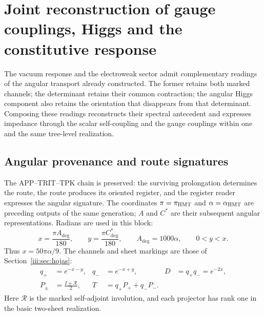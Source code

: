\section{Joint reconstruction of gauge couplings, Higgs and the constitutive response}
\label{amp-higgs-seccion}

The vacuum response and the electroweak sector admit complementary readings
of the angular transport already constructed. The former retains both marked
channels; the determinant retains their common contraction; the angular Higgs
component also retains the orientation that disappears from that determinant.
Composing these readings reconstructs their spectral antecedent and expresses
impedance through the scalar self-coupling and the gauge couplings within one
and the same tree-level realization.

\subsection{Angular provenance and route signatures}

The APP--TRIT--TPK chain is preserved: the surviving prolongation determines
the route, the route produces its oriented register, and the register reader
expresses the angular signature. The coordinates $\pi=\pi_{\rm HMT}$ and
$\alpha=\alpha_{\rm HMT}$ are preceding outputs of the same generation;
$A$ and $C^*$ are their subsequent angular representations. Radians are used
in this block:
\begin{equation}
 x=\frac{\pi A_{\deg}}{180},\qquad
 y=\frac{\pi C^*_{\deg}}{180},\qquad
 A_{\deg}=1000\alpha,\qquad 0<y<x.
 \label{amp-higgs-angulos}
\end{equation}
Thus $x=50\pi\alpha/9$. The channels and sheet markings are those of
Section~\ref{iii:sec:hojas}:
\begin{equation}
 \begin{aligned}
 q_+&=e^{-x-y},& q_-&=e^{-x+y},& D&=q_+q_-=e^{-2x},\\
 P_\pm&=\frac{I\pm\mathcal R}{2},&
 T&=q_+P_++q_-P_-.
 \end{aligned}
 \label{amp-higgs-transporte}
\end{equation}
Here $\mathcal R$ is the marked self-adjoint involution, and each projector
has rank one in the basic two-sheet realization.

